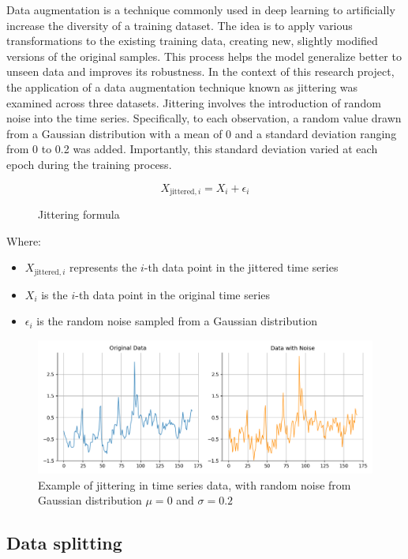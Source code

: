 Data augmentation is a technique commonly used in deep learning to artificially increase the diversity of a training dataset. The idea is to apply various transformations to the existing training data, creating new, slightly modified versions of the original samples. This process helps the model generalize better to unseen data and improves its robustness.
In the context of this research project, the application of a data augmentation technique known as jittering was examined across three datasets. Jittering involves the introduction of random noise into the time series. Specifically, to each observation, a random value drawn from a Gaussian distribution with a mean of 0 and a standard deviation ranging from 0 to 0.2 was added. Importantly, this standard deviation varied at each epoch during the training process.

\begin{figure}
\[X_{\text{jittered}, i} = X_i + \epsilon_i\]
\caption{Jittering formula}
\label{eq:jittering}
\end{figure}
Where: 
\begin{itemize}[noitemsep, leftmargin=*]
    \item[] $X_{\text{jittered}, i}$ represents the \(i\)-th data point in the jittered time series
    \item[] \(X_i\) is the \(i\)-th data point in the original time series
    \item[] \(\epsilon_i\) is the random noise sampled from a Gaussian distribution
\end{itemize}

\begin{figure}
    \centering
    \includegraphics[width=0.75\linewidth]{images/jittering.png}
    \caption{Example of jittering in time series data, with random noise from Gaussian distribution $\mu = 0$ and $\sigma = 0.2$}
    \label{fig:jittering}
\end{figure}


\subsection{Data splitting}

